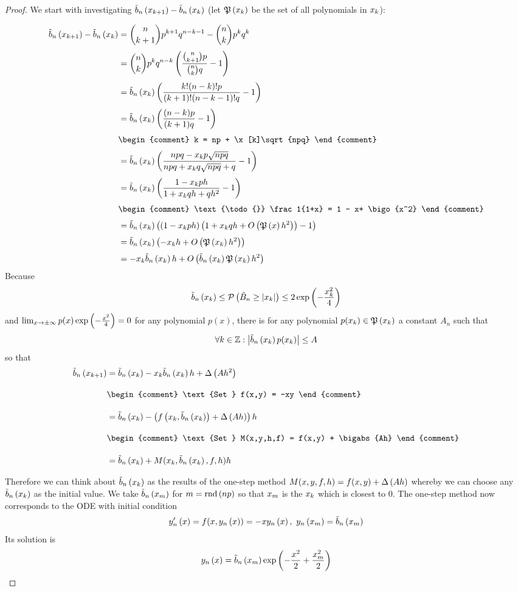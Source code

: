 \begin{proof}
  We start with investigating $\bb{\x[k+1]}-\bb{\x[k]}$ (let $\pol{\x}$ be the set of all polynomials in $\x$):

  \begin{align}
    \bb{\x[k+1]} - \bb{\x[k]} &= \binom n{k+1} p^{k+1}q^{n-k-1} - \binom nk p^k q^k \nl
    &= \binom nk p^k q^{n-k} \br{\frac{\binom n{k+1}p}{\binom nk q} -1} \nl
    &= \bb{\x[k]} \br{\frac{k! (n-k)! p}{(k+1)!(n-k-1)! q} -1} \nl
    &= \bb{\x[k]} \br{\frac{(n-k)p}{(k+1)q}-1} \nl
    &
    \begin{comment}
      k = np + \x[k]\sqrt{npq}
    \end{comment} \nl
    &= \bb{\x[k]} \br{\frac{npq-\x[k]p\sqrt{npq}}{npq + \x[k]q\sqrt{npq}+q}-1} \nl
    &= \bb{\x[k]} \br{\frac{1-\x[k]ph}{1+\x[k]qh+qh^2}-1} \nl
    &
    \begin{comment}
      \text{\todo{}} \frac1{1+x} = 1 - x+ \bigo{x^2}
    \end{comment} \nl
    &= \bb{\x[k]} \br{\br{1-\x[k]ph}\br{1+\x[k]qh + \bigo{\pol{x}h^2}}-1} \nl
    &= \bb{\x[k]} \br{-\x[k]h + \bigo{\pol{\x}h^2}} \nl
    &= -\x[k]\bb{\x}h + \bigo{\bb{\x}\pol{\x}h^2}
  \end{align}
  Because 
  \begin{align}
    \bb{\x} \le \P{\BBs \ge \abs{x_k}} \le 2\fexp{-\frac{\x^2}4}
  \end{align}
  and $\lim_{x\to\pm\infty} p(x)\fexp{-\frac{x^2}4}=0$ for any polynomial $p(x)$, there is for any polynomial $p(\x)\in\pol{\x}$ a constant $A_n$ such that
  \begin{align}
    \forall k\in\Z: \abs{\bb{\x}p(\x)} \le A
  \end{align}
  so that
  \begin{align}
    \bb{\x[k+1]} &= \bb{\x[k]} -\x[k]\bb{\x[k]} h + \bigabs{A h^2} \bnl
    &
    \begin{comment}
      \text{Set } f(x,y) = -xy
    \end{comment} \bnl
    &= \bb{\x[k]} - \br{\f{\x[k], \bb{\x[k]}} + \bigabs{A h}}h \bnl
    &
    \begin{comment}
      \text{Set } M(x,y,h,f) = f(x,y) + \bigabs{Ah}
    \end{comment} \bnl
    &= \bb{\x[k]} + M(\x[k], \bb{\x[k]}, f, h) h
  \end{align}

  Therefore we can think about $\bb{\x}$ as the results of the one-step method $M(x,y,f,h)=f(x,y)+\bigabs{Ah}$ whereby we can choose any $\bb{\x}$ as the initial value. We take $\bb{\xnp}$ for $\knp=\rnd{np}$ so that $\xnp$ is the $\x$ which is closest to $0$. The one-step method now corresponds to the ODE with initial condition
  \begin{align}
    \dphin{x}=f(x,\phin{x})=-x\phin{x},\ \phin{\xnp} = \bb{\xnp}
  \end{align}
  Its solution is
  \begin{align}
    \phin{x} = \bb{\xnp}\fexp{-\frac{x^2}2+\frac{\xnp^2}2}
  \end{align}


\end{proof}
